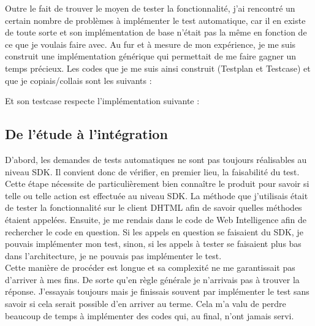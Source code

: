 Outre le fait de trouver le moyen de tester la fonctionnalit\'{e}, j'ai rencontr\'{e} un certain nombre de probl\`{e}mes \`{a} impl\'{e}menter le test automatique, car il en existe de toute sorte et son impl\'{e}mentation de base n'\'{e}tait pas la m\^{e}me en fonction de ce que je voulais faire avec. Au fur et \`{a} mesure de mon exp\'{e}rience, je me suis construit une impl\'{e}mentation g\'{e}n\'{e}rique qui permettait de me faire gagner un temps pr\'{e}cieux. Les codes que je me suis ainsi construit (\gls{Testplan} et \gls{Testcase}) et que je copiais/collais sont les suivants :




Et son testcase respecte l'impl\'{e}mentation suivante :







\subsection{De l'\'{e}tude \`{a} l'int\'{e}gration}

D'abord, les demandes de tests automatiques ne sont pas toujours r\'{e}alisables au niveau SDK. Il convient donc de v\'{e}rifier, en premier lieu, la faisabilit\'{e} du test. Cette \'{e}tape n\'{e}cessite de particuli\`{e}rement bien conna\^{i}tre le produit pour savoir si telle ou telle action est effectu\'{e}e au niveau \gls{SDK}. La m\'{e}thode que j'utilisais \'{e}tait de tester la fonctionnalit\'{e} sur le client DHTML afin de savoir quelles m\'{e}thodes \'{e}taient appel\'{e}es. Ensuite, je me rendais dans le code de Web Intelligence afin de rechercher le code en question. Si les appels en question se faisaient du SDK, je pouvais impl\'{e}menter mon test, sinon, si les appels \`{a} tester se faisaient plus bas dans l'architecture, je ne pouvais pas impl\'{e}menter le test.\\
Cette mani\`{e}re de proc\'{e}der est longue et sa complexit\'{e} ne me garantissait pas d'arriver \`{a} mes fins. De sorte qu'en r\`{e}gle g\'{e}n\'{e}rale je n'arrivais pas \`{a} trouver la r\'{e}ponse. J'essayais toujours mais je finissais souvent par impl\'{e}menter le test sans savoir si cela serait possible d'en arriver au terme. Cela m'a valu de perdre beaucoup de temps \`{a} impl\'{e}menter des codes qui, au final, n'ont jamais servi.\\

